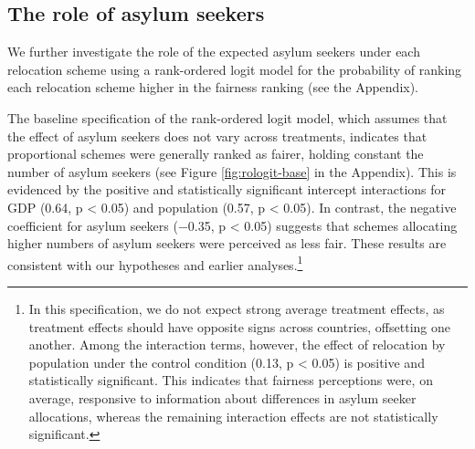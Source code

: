 \documentclass[
  12pt,
  a4paper,
]{article}
\begin{document}
\subsection{The role of asylum seekers}\label{the-role-of-asylum-seekers}

We further investigate the role of the expected asylum seekers under each relocation scheme using a rank-ordered logit model for the probability of ranking each relocation scheme higher in the fairness ranking (see the Appendix).

The baseline specification of the rank-ordered logit model, which assumes that the effect of asylum seekers does not vary across treatments, indicates that proportional schemes were generally ranked as fairer, holding constant the number of asylum seekers (see Figure \ref{fig:rologit-base} in the Appendix). This is evidenced by the positive and statistically significant intercept interactions for GDP (0.64, p \textless{} 0.05) and population (0.57, p \textless{} 0.05). In contrast, the negative coefficient for asylum seekers (−0.35, p \textless{} 0.05) suggests that schemes allocating higher numbers of asylum seekers were perceived as less fair. These results are consistent with our hypotheses and earlier analyses.\footnote{
  In this specification, we do not expect strong average treatment effects, as treatment effects should have opposite signs across countries, offsetting one another. Among the interaction terms, however, the effect of relocation by population under the control condition (0.13, p \textless{} 0.05) is positive and statistically significant. This indicates that fairness perceptions were, on average, responsive to information about differences in asylum seeker allocations, whereas the remaining interaction effects are not statistically significant.}
\end{document}
